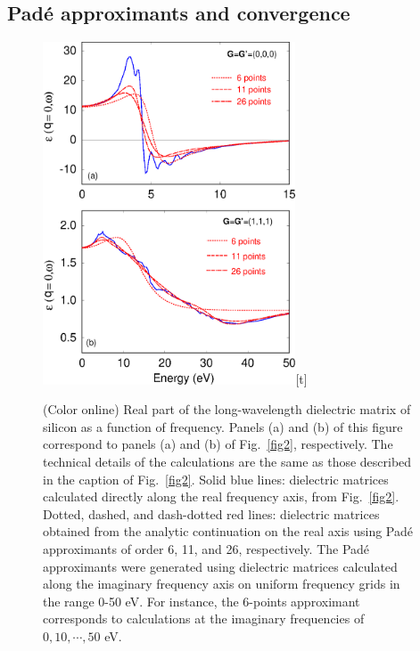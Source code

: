 \documentclass[twocolumn,prb,showpacs,superscriptaddress]{revtex4}
\begin{document}
\subsection{Pad\'e approximants and convergence}\label{sec.conv}

\begin  {figure}
\begin  {center}
\includegraphics[width=7.5cm]{fig3.eps}[t]
\end    {center}
\caption{\label{fig3}
        (Color online)
        Real part of the long-wavelength dielectric matrix of silicon as a function of frequency.
        Panels (a) and (b) of this figure correspond to panels (a) and (b) of Fig.~\ref{fig2}, respectively. The
        technical details of the calculations are the same as those described in the caption of Fig.\ \ref{fig2}.
        Solid blue lines: dielectric matrices calculated directly along the real frequency axis,
        from  Fig.\ \ref{fig2}. Dotted, dashed, and dash-dotted red lines: dielectric matrices
        obtained from the analytic continuation on the real axis using Pad\'e approximants of order
        6, 11, and 26, respectively. The Pad\'e approximants were generated using dielectric
        matrices calculated along the imaginary frequency axis on uniform frequency grids
        in the range 0-50 eV. For instance, the 6-points approximant corresponds to calculations
        at the imaginary frequencies of $0,10,\cdots,50$ eV.
        }
\end    {figure}
\end{document}

